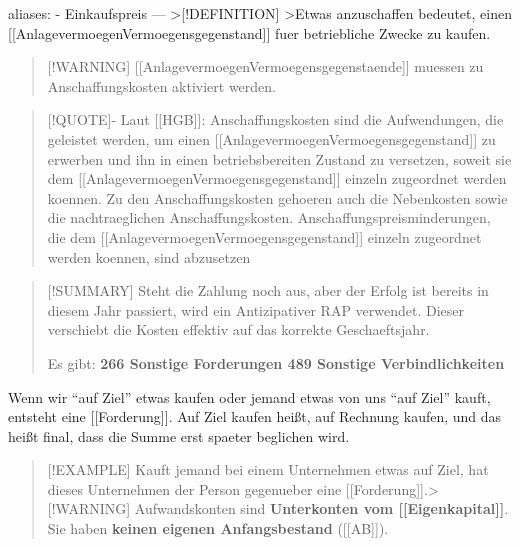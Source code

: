 aliases: - Einkaufspreis --- \textgreater{[}!DEFINITION{]}
\textgreater Etwas anzuschaffen bedeutet, einen
{[}{[}Anlagevermoegen\textbar Vermoegensgegenstand{]}{]} fuer betriebliche
Zwecke zu kaufen.

\begin{quote}
{[}!WARNING{]} {[}{[}Anlagevermoegen\textbar Vermoegensgegenstaende{]}{]}
muessen zu Anschaffungskosten aktiviert werden.
\end{quote}

\begin{quote}
{[}!QUOTE{]}- Laut {[}{[}HGB{]}{]}: Anschaffungskosten sind die
Aufwendungen, die geleistet werden, um einen
{[}{[}Anlagevermoegen\textbar Vermoegensgegenstand{]}{]} zu erwerben und
ihn in einen betriebsbereiten Zustand zu versetzen, soweit sie dem
{[}{[}Anlagevermoegen\textbar Vermoegensgegenstand{]}{]} einzeln
zugeordnet werden koennen. Zu den Anschaffungskosten gehoeren auch die
Nebenkosten sowie die nachtraeglichen Anschaffungskosten.
Anschaffungspreisminderungen, die dem
{[}{[}Anlagevermoegen\textbar Vermoegensgegenstand{]}{]} einzeln
zugeordnet werden koennen, sind abzusetzen
\end{quote}

\begin{quote}
{[}!SUMMARY{]} Steht die Zahlung noch aus, aber der Erfolg ist bereits
in diesem Jahr passiert, wird ein Antizipativer RAP verwendet. Dieser
verschiebt die Kosten effektiv auf das korrekte Geschaeftsjahr.

Es gibt: \textbf{266 Sonstige Forderungen 489 Sonstige
Verbindlichkeiten}
\end{quote}

Wenn wir ``auf Ziel'' etwas kaufen oder jemand etwas von uns ``auf
Ziel'' kauft, entsteht eine {[}{[}Forderung{]}{]}. Auf Ziel kaufen
heißt, auf Rechnung kaufen, und das heißt final, dass die Summe erst
spaeter beglichen wird.

\begin{quote}
{[}!EXAMPLE{]} Kauft jemand bei einem Unternehmen etwas auf Ziel, hat
dieses Unternehmen der Person gegenueber eine
{[}{[}Forderung{]}{]}.\textgreater{[}!WARNING{]} Aufwandskonten sind
\textbf{Unterkonten vom {[}{[}Eigenkapital{]}{]}}. Sie haben
\textbf{keinen eigenen Anfangsbestand} ({[}{[}AB{]}{]}).
\end{quote}

